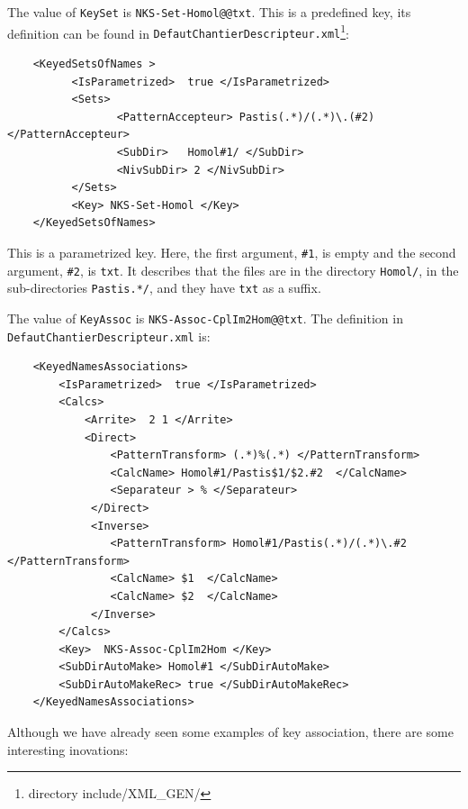 The value of {\tt KeySet} is {\tt NKS-Set-Homol@@txt}. This is a predefined key,
its definition can be found in 
{\tt DefautChantierDescripteur.xml}\footnote{directory include/XML\_GEN/}:


{\scriptsize
\begin{verbatim}
    <KeyedSetsOfNames >
          <IsParametrized>  true </IsParametrized>
          <Sets>
                 <PatternAccepteur> Pastis(.*)/(.*)\.(#2)  </PatternAccepteur>
                 <SubDir>   Homol#1/ </SubDir>
                 <NivSubDir> 2 </NivSubDir>
          </Sets>
          <Key> NKS-Set-Homol </Key>
    </KeyedSetsOfNames>
\end{verbatim}
}

This is a parametrized key. Here, the first argument, {\tt \#1}, is empty and 
the second argument, {\tt \#2}, is {\tt txt}.
It describes that the files are in the directory {\tt Homol/}, in the sub-directories {\tt Pastis.*/},
and they have {\tt txt} as a suffix.


The value of {\tt KeyAssoc} is {\tt NKS-Assoc-CplIm2Hom@@txt}.
The definition in {\tt DefautChantierDescripteur.xml} is:

{\scriptsize
\begin{verbatim}
    <KeyedNamesAssociations>
        <IsParametrized>  true </IsParametrized>
        <Calcs>
            <Arrite>  2 1 </Arrite>
            <Direct>
                <PatternTransform> (.*)%(.*) </PatternTransform>
                <CalcName> Homol#1/Pastis$1/$2.#2  </CalcName>
                <Separateur > % </Separateur>
             </Direct>
             <Inverse>
                <PatternTransform> Homol#1/Pastis(.*)/(.*)\.#2 </PatternTransform>
                <CalcName> $1  </CalcName>
                <CalcName> $2  </CalcName>
             </Inverse>
        </Calcs>
        <Key>  NKS-Assoc-CplIm2Hom </Key>
        <SubDirAutoMake> Homol#1 </SubDirAutoMake>
        <SubDirAutoMakeRec> true </SubDirAutoMakeRec>
    </KeyedNamesAssociations>
\end{verbatim}
}

Although we have already seen some examples of key association, there are
some interesting inovations:

